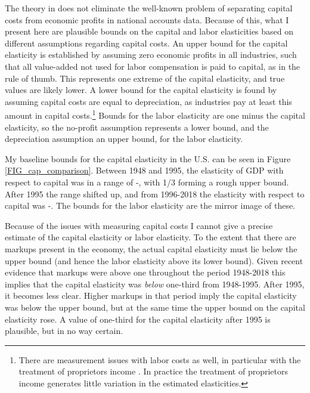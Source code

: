 \documentclass[11pt]{article}
\begin{document}
The theory in \cite{bfshortnote,bfprodge} does not eliminate the well-known problem of separating capital costs from economic profits in national accounts data. Because of this, what I present here are plausible bounds on the capital and labor elasticities based on different assumptions regarding capital costs. An upper bound for the capital elasticity is established by assuming zero economic profits in all industries, such that all value-added not used for labor compensation is paid to capital, as in the rule of thumb. This represents one extreme of the capital elasticity, and true values are likely lower. A lower bound for the capital elasticity is found by assuming capital costs are equal to depreciation, as industries pay at least this amount in capital costs.\footnote{There are measurement issues with labor costs as well, in particular with the treatment of proprietors income \citep{Gollin:2002zr,gommerupert2004,elsbyhs2013}. In practice the treatment of proprietors income generates little variation in the estimated elasticities.} Bounds for the labor elasticity are one minus the capital elasticity, so the no-profit assumption represents a lower bound, and the depreciation assumption an upper bound, for the labor elasticity. 

My baseline bounds for the capital elasticity in the U.S. can be seen in Figure \ref{FIG_cap_comparison}. Between 1948 and 1995, the elasticity of GDP with respect to capital was in a range of \baseearlydepr-\baseearlynoprofit, with 1/3 forming a rough upper bound. After 1995 the range shifted up, and from 1996-2018 the elasticity with respect to capital was \baselatedepr-\baselatenoprofit. The bounds for the labor elasticity are the mirror image of these.

Because of the issues with measuring capital costs I cannot give a precise estimate of the capital elasticity or labor elasticity. To the extent that there are markups present in the economy, the actual capital elasticity must lie below the upper bound (and hence the labor elasticity above its lower bound). Given recent evidence that markups were above one throughout the period 1948-2018 \citep{Barkai000,edmondetal2018,NBERw23687,RePEc:nbr:nberwo:22897,basu2019} this implies that the capital elasticity was \textit{below} one-third from 1948-1995. After 1995, it becomes less clear. Higher markups in that period imply the capital elasticity was below the upper bound, but at the same time the upper bound on the capital elasticity rose. A value of one-third for the capital elasticity after 1995 is plausible, but in no way certain.
\end{document}
